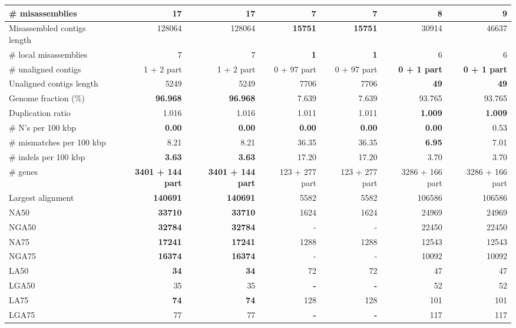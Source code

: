 \documentclass[12pt,a4paper]{article}
\begin{document}
\begin{table}[ht]
\begin{center}
\begin{tabular}{|l*{6}{|r}|}
\# misassemblies & 17 & 17 & {\bf 7} & {\bf 7} & 8 & 9 \\ \hline
Misassembled contigs length & 128064 & 128064 & {\bf 15751} & {\bf 15751} & 30914 & 46637 \\ \hline
\# local misassemblies & 7 & 7 & {\bf 1} & {\bf 1} & 6 & 6 \\ \hline
\# unaligned contigs & 1 + 2 part & 1 + 2 part & 0 + 97 part & 0 + 97 part & {\bf 0 + 1 part} & {\bf 0 + 1 part} \\ \hline
Unaligned contigs length & 5249 & 5249 & 7706 & 7706 & {\bf 49} & {\bf 49} \\ \hline
Genome fraction (\%) & {\bf 96.968} & {\bf 96.968} & 7.639 & 7.639 & 93.765 & 93.765 \\ \hline
Duplication ratio & 1.016 & 1.016 & 1.011 & 1.011 & {\bf 1.009} & {\bf 1.009} \\ \hline
\# N's per 100 kbp & {\bf 0.00} & {\bf 0.00} & {\bf 0.00} & {\bf 0.00} & {\bf 0.00} & 0.53 \\ \hline
\# mismatches per 100 kbp & 8.21 & 8.21 & 36.35 & 36.35 & {\bf 6.95} & 7.01 \\ \hline
\# indels per 100 kbp & {\bf 3.63} & {\bf 3.63} & 17.20 & 17.20 & 3.70 & 3.70 \\ \hline
\# genes & {\bf 3401 + 144 part} & {\bf 3401 + 144 part} & 123 + 277 part & 123 + 277 part & 3286 + 166 part & 3286 + 166 part \\ \hline
Largest alignment & {\bf 140691} & {\bf 140691} & 5582 & 5582 & 106586 & 106586 \\ \hline
NA50 & {\bf 33710} & {\bf 33710} & 1624 & 1624 & 24969 & 24969 \\ \hline
NGA50 & {\bf 32784} & {\bf 32784} & - & - & 22450 & 22450 \\ \hline
NA75 & {\bf 17241} & {\bf 17241} & 1288 & 1288 & 12543 & 12543 \\ \hline
NGA75 & {\bf 16374} & {\bf 16374} & - & - & 10092 & 10092 \\ \hline
LA50 & {\bf 34} & {\bf 34} & 72 & 72 & 47 & 47 \\ \hline
LGA50 & 35 & 35 & {\bf -} & {\bf -} & 52 & 52 \\ \hline
LA75 & {\bf 74} & {\bf 74} & 128 & 128 & 101 & 101 \\ \hline
LGA75 & 77 & 77 & {\bf -} & {\bf -} & 117 & 117 \\ \hline
\end{tabular}
\end{center}
\end{table}
\end{document}
